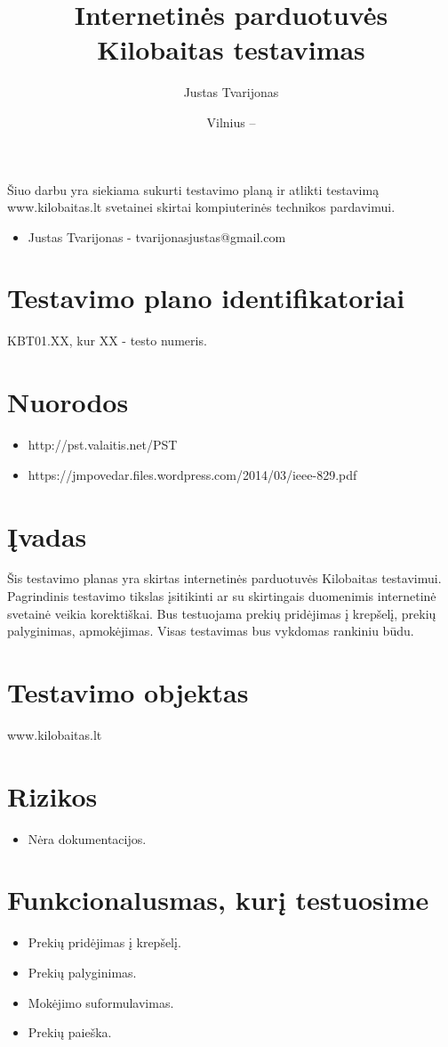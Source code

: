 \documentclass{VUMIFPSkursinis}
\title{Internetinės parduotuvės Kilobaitas testavimas}
\author{Justas Tvarijonas}
\date{Vilnius – \the\year}
\begin{document}
\maketitle
{}
Šiuo darbu yra siekiama sukurti testavimo planą ir atlikti testavimą www.kilobaitas.lt svetainei skirtai kompiuterinės technikos pardavimui.
\begin{itemize}
	\item Justas Tvarijonas - tvarijonasjustas@gmail.com
\end{itemize}
\tableofcontents
{}
\section{Testavimo plano identifikatoriai}
KBT01.XX, kur XX - testo numeris.
\section{Nuorodos}
\begin{itemize}
	\item http://pst.valaitis.net/PST
	\item https://jmpovedar.files.wordpress.com/2014/03/ieee-829.pdf
\end{itemize}
\section{Įvadas}
Šis testavimo planas yra skirtas internetinės parduotuvės Kilobaitas testavimui. Pagrindinis testavimo tikslas įsitikinti ar su skirtingais duomenimis internetinė svetainė veikia korektiškai. Bus testuojama prekių pridėjimas į krepšelį, prekių palyginimas, apmokėjimas. Visas testavimas bus vykdomas rankiniu būdu.
\section{Testavimo objektas}
www.kilobaitas.lt
\section{Rizikos}
\begin{itemize}
	\item Nėra dokumentacijos.
\end{itemize}
\section{Funkcionalusmas, kurį testuosime}
\begin{itemize}
	\item Prekių pridėjimas į krepšelį.
	\item Prekių palyginimas.
	\item Mokėjimo suformulavimas. 
	\item Prekių paieška.
\end{itemize}
\end{document}
